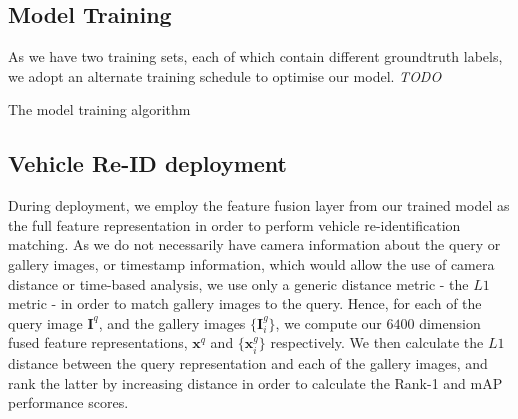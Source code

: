 \documentclass[10pt,twocolumn,letterpaper]{article}
\begin{document}
\subsection{Model Training}

As we have two training sets, each of which contain different groundtruth labels, we adopt an alternate training schedule to optimise our model. \emph{TODO}

\begin{algorithm}[t]
  \caption{The model training algorithm}
  \label{A:model_training}
  \begin{algorithmic}
    \STATE{$\bullet$ Initialise output layers of $\mathcal{M}$ randomly}



        \ENDIF


      \ENDFOR
    \ENDFOR

  \end{algorithmic}
\end{algorithm}

\subsection{Vehicle Re-ID deployment}

During deployment, we employ the feature fusion layer from our trained model as the full feature representation in order to perform vehicle re-identification matching. As we do not necessarily have camera information about the query or gallery images, or timestamp information, which would allow the use of camera distance or time-based analysis, we use only a generic distance metric - the $L1$ metric - in order to match gallery images to the query. Hence, for each of the query image $\mathbf{I}^q$, and the gallery images $\{\mathbf{I}_i^g\}$,  we compute our $6400$ dimension fused feature representations, $\mathbf{x}^q$ and $\{\mathbf{x}_i^g\}$ respectively. We then calculate the $L1$ distance between the query representation and each of the gallery images, and rank the latter by increasing distance in order to calculate the Rank-1 and mAP performance scores.
\end{document}
